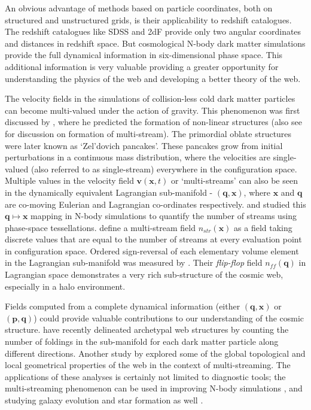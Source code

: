 An obvious advantage of methods based on particle coordinates, both on structured and unstructured grids, is their applicability to redshift catalogues. The redshift catalogues like SDSS and 2dF provide only two angular coordinates and distances in redshift space. But cosmological N-body dark matter simulations provide the full dynamical information in six-dimensional phase space. This additional information is very valuable providing a greater opportunity for understanding the physics of the web and developing a better theory of the web.


The velocity fields in the simulations of collision-less cold dark matter particles can become multi-valued under the action of gravity. This phenomenon was first discussed by \cite{Zeldovich1970}, where he predicted the formation of non-linear structures (also see \citealt{Shandarin1989} for discussion on formation of multi-stream). The primordial oblate structures were later known as `Zel'dovich pancakes'. These pancakes grow from initial perturbations in a continuous mass distribution, where the velocities are single-valued (also referred to as single-stream) everywhere in the configuration space. Multiple values in the velocity field $\mathbf{v} (\mathbf{x},t)$ or `multi-streams' can also be seen in the dynamically equivalent Lagrangian sub-manifold - $(\mathbf{q}, \mathbf{x})$, where $\mathbf{x}$ and $\mathbf{q}$ are co-moving Eulerian and Lagrangian co-ordinates respectively. \cite{Shandarin2011} and \cite{Abel2012} studied this $ \mathbf{q} \mapsto \mathbf{x}$ mapping in N-body simulations to quantify the number of streams using phase-space tessellations. \cite{Shandarin2011} define a multi-stream field $n_{str}(\mathbf{x})$ as a field taking discrete values that are equal to the number of streams at every evaluation point in configuration space. Ordered sign-reversal of each elementary volume element in the Lagrangian sub-manifold was measured by \cite{Shandarin2014a}. Their {\it flip-flop} field $n_{ff}(\mathbf{q})$ in Lagrangian space demonstrates a very rich sub-structure of the cosmic web, especially in a halo environment. 

Fields computed from a complete dynamical information (either $(\mathbf{q}, \mathbf{x})$ or $(\mathbf{p}, \mathbf{q})$) could provide valuable contributions to our understanding of the cosmic structure. \cite{Falck2012} have recently delineated archetypal web structures by counting the number of foldings in the sub-manifold for each dark matter particle along different directions. Another study by \cite{Ramachandra2016a} explored some of the global topological and local geometrical properties of the web in the context of multi-streaming. The applications of these analyses is certainly not limited to diagnostic tools; the multi-streaming phenomenon can be used in improving N-body simulations \citep{Hahn2013}, and studying galaxy evolution and star formation as well \citep{Aragon-Calvo2016}. 



